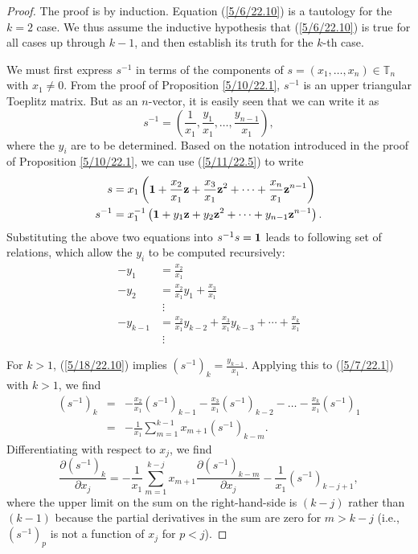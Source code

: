 \documentclass{amsart}
\numberwithin{equation}{section}
\theoremstyle{definition}
\numberwithin{theorem}{section}
\begin{document}
\begin{proof} The proof is by induction. Equation (\ref{5/6/22.10}) is a tautology for the $k=2$ case.  We thus assume the inductive hypothesis that (\ref{5/6/22.10}) is true  for all cases up through $k-1$, and then establish its truth for the $k$-th case.


We must first express $s^{-1}$ in terms of the components of  $s=(x_1,\dots,x_n)\in \mathbb{T}_n$ with $x_1\ne 0$.   From the proof of Proposition \ref{5/10/22.1},  $s^{-1}$ is an upper triangular Toeplitz matrix.  But as an $n$-vector, it is easily seen that we can write it as  \begin{equation}\label{5/9/22.1} s^{-1} = (\frac{1}{x_1}, \frac{y_1}{x_1},\dots, \frac{y_{n-1}}{x_1}),\end{equation} where the $y_i$ are to be determined. 
Based on the notation introduced in the proof of Proposition \ref{5/10/22.1}, we can use (\ref{5/11/22.5}) to write 
\begin{align}\nonumber s &= x_1 \left({\bf 1} + \frac{x_2}{x_1} {\bf z} + \frac{x_3}{x_1} {\bf z}^2 + \cdots + \frac{x_n}{x_1} {\bf z}^{n-1}\right)\\ s^{-1} &= x_1^{-1} \left({\bf 1} + y_1 {\bf z} + y_2 {\bf z}^2 + \cdots + y_{n-1} {\bf z}^{n-1}\right).  \label{5/18/22.10} \end{align}  Substituting the above two equations into $s^{-1} s = {\bf 1}$ leads to following set of relations, which allow the $y_i$ to be computed recursively:
\begin{align} -y_1 &= \frac{x_2}{x_1} \nonumber \\ -y_2 &= \frac{x_2}{x_1}y_1 + \frac{x_3}{x_1} \nonumber \\ &\;\vdots \nonumber \\ -y_{k-1} &= \frac{x_2}{x_1} y_{k-2} + \frac{x_3}{x_1} y_{k-3} + \cdots + \frac{x_k}{x_1} \label{5/7/22.1} \\ &\;\vdots \nonumber \end{align} 
 
 \noindent For $k>1$, (\ref{5/18/22.10}) implies  $\left( s^{-1} \right)_k = \frac{y_{k-1}}{x_1}$.  Applying this to (\ref{5/7/22.1}) with $k>1$, we find
\begin{eqnarray} \nonumber \left( s^{-1} \right)_k &=& -\frac{x_2}{x_1}\left( s^{-1} \right)_{k-1} - \frac{x_3}{x_1}\left( s^{-1} \right)_{k-2} -\dots  - \frac{x_k}{x_1}\left( s^{-1} \right)_1 \\ &=& -\frac{1}{x_1}\sum_{m=1}^{k-1} x_{m+1}\left( s^{-1} \right)_{k-m}. \label{5/7/22.2}\end{eqnarray}
Differentiating with respect to $x_j$, we find \begin{equation}  \frac{\partial \left( s^{-1} \right)_k}{\partial x_j} = -\frac{1}{x_1} \sum_{m=1}^{k-j} x_{m+1} \frac{\partial \left( s^{-1} \right)_{k-m}}{\partial x_j} -  \frac{1}{x_1}\left( s^{-1} \right)_{k-j+1} \label{5/7/22.4}, \end{equation} where the upper limit on the sum on the right-hand-side is $(k-j)$ rather than $(k-1)$ because the partial derivatives in the sum are zero for $m> k-j$ (i.e., $\left( s^{-1} \right)_p$ is not a function of $x_j$ for $p<j$).  


\end{proof}
\end{document}
